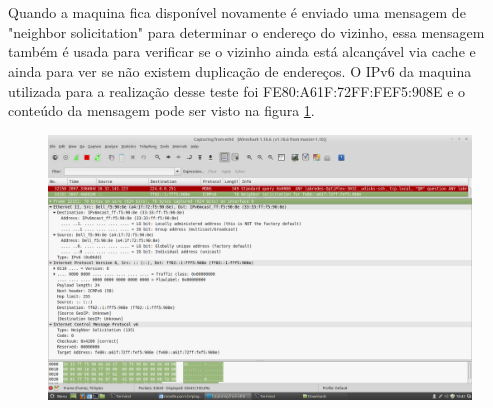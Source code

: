 \documentclass[12pt]{article}
\begin{document}
\section{}
Quando a maquina fica disponível novamente é enviado uma mensagem de "neighbor solicitation" para determinar o endereço do vizinho, essa mensagem também é usada para verificar se o vizinho ainda está alcançável via cache e ainda para ver se não existem duplicação de endereços. O IPv6 da maquina utilizada para a realização desse teste foi FE80:A61F:72FF:FEF5:908E e o conteúdo da mensagem pode ser visto na figura \ref{2}.

\begin{figure}[ht]
\centering
\includegraphics[scale=0.25]{dois.png}
\caption{}
\label{2}
\end{figure}
\end{document}
